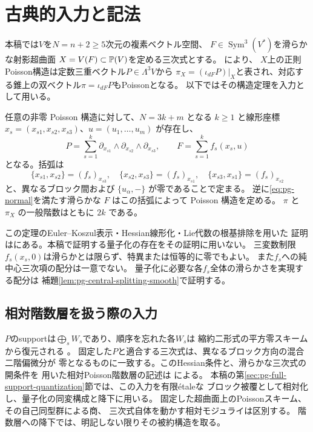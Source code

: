 \section{古典的入力と記法}\label{sec:cq-classical-input}
本稿では$V$を$N=n+2\ge5$次元の複素ベクトル空間、
$F\in\operatorname{Sym}^3(V^*)$を滑らかな射影超曲面
$X=V(F)\subset\mathbb P(V)$を定める三次式とする。
\cite[大域双ベクトル場の表示およびPoisson正規形定理]{PoissonCubic}により、
$X$上の正則Poisson構造は定数三重ベクトル$P\in\Lambda^3V$から
$\pi_X=(\iota_{dF}P)|_X$と表され、対応する錐上の双ベクトル$\pi=\iota_{dF}P$もPoissonとなる。
以下ではその構造定理を入力として用いる。

\begin{theorem}\label{thm:pg-normal}
任意の非零 Poisson 構造に対して、$N=3k+m$ となる $k\geq1$ と線形座標
$x_s=(x_{s1},x_{s2},x_{s3})$、$u=(u_1,\ldots,u_m)$ が存在し、
\begin{equation}
P=\sum_{s=1}^k\partial_{x_{s1}}\wedge\partial_{x_{s2}}\wedge\partial_{x_{s3}},
\qquad F=\sum_{s=1}^k f_s(x_s,u)\label{eq:pg-normal}
\end{equation}
となる。括弧は
\begin{equation}
\{x_{s1},x_{s2}\}=(f_s)_{x_{s3}},\quad
\{x_{s2},x_{s3}\}=(f_s)_{x_{s1}},\quad
\{x_{s3},x_{s1}\}=(f_s)_{x_{s2}}\label{eq:pg-bracket}
\end{equation}
と、異なるブロック間および $\{u_\alpha,-\}$ が零であることで定まる。
逆に\eqref{eq:pg-normal}を満たす滑らかな $F$ はこの括弧によって Poisson 構造を定める。
$\pi$ と $\pi_X$ の一般階数はともに $2k$ である。
\end{theorem}

この定理のEuler--Koszul表示・Hessian線形化・Lie代数の根基排除を用いた
証明は\cite{PoissonCubic}にある。本稿で証明する量子化の存在をその証明に用いない。
三変数制限$f_s(x_s,0)$は滑らかとは限らず、特異または恒等的に零でもよい。
また$f_s$への純中心三次項の配分は一意でない。
量子化に必要な各$f_s$全体の滑らかさを実現する配分は
補題\ref{lem:pg-central-splitting-smooth}で証明する。

\subsection{相対階数層を扱う際の入力}
$P$のsupportは$\bigoplus_sW_s$であり、順序を忘れた各$W_s$は
縮約二形式の平方零スキームから復元される
\cite[縮約二形式による復元補題]{PoissonCubic}。
固定した$P$と適合する三次式は、異なるブロック方向の混合二階偏微分が
零となるものに一致する。このHessian条件と、滑らかな三次式の開条件を
用いた相対Poisson階数層の記述は
\cite[Jacobi条件の線形化および相対Poisson成分定理]{PoissonCubic}による。
本稿の第\ref{sec:pg-full-support-quantization}節では、この入力を有限\'etaleな
ブロック被覆として相対化し、量子化の同変構成と降下に用いる。
固定した超曲面上のPoissonスキーム、その自己同型群による商、
三次式自体を動かす相対モジュライは区別する。
階数層への降下では、明記しない限りその被約構造を取る。

